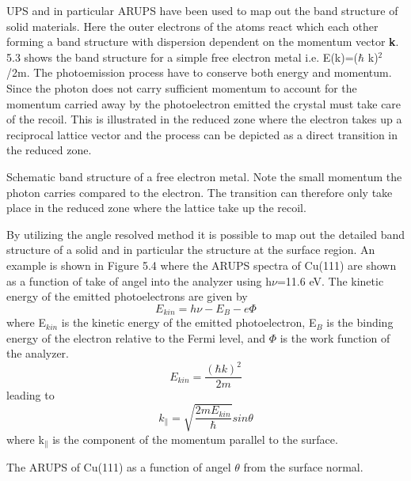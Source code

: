 UPS and in particular ARUPS have been used to map out the band structure of solid materials. Here the outer electrons of the atoms react which each other forming a band structure with dispersion dependent on the momentum vector {\bf k}. 5.3 shows the band structure for a simple free electron metal i.e. E(k)=($\hbar$ k)$^2$/2m. The photoemission process have to conserve both energy and momentum. Since the photon does not carry sufficient momentum to account for the momentum carried away by the photoelectron emitted  the crystal must take care of the recoil. This is illustrated in the reduced zone where the electron takes up a reciprocal lattice vector and the process can be depicted as a direct transition in the reduced zone.


\vspace*{11cm}

           Schematic band structure of a free electron metal. Note the small momentum the photon carries compared to the electron. The transition can therefore only take place in the reduced zone where the lattice take up the recoil.

\vspace{1cm}

By utilizing the angle resolved method it is possible to map out the detailed band structure of a solid and in particular the structure at the surface region. An example is shown in Figure 5.4 where the ARUPS spectra of Cu(111) are shown as a function of take of angel into the analyzer using h$\nu$=11.6 eV.  The kinetic energy of the emitted  photoelectrons are given by
\begin{equation}
E_{kin}=h\nu-E_B-e\Phi
\end{equation}
where E$_{kin}$ is the kinetic energy of the emitted photoelectron, E$_B$ is the binding energy of the electron relative to the Fermi level, and $\Phi$ is the work function of the analyzer.
\begin{equation}
E_{kin}=\frac{(\hbar k)^2}{2m}
\end{equation}
leading to 
\begin{equation}
k_\parallel=\sqrt{\frac{2mE_{kin}}{\hbar}}sin{\theta}
\end{equation}
where k$_\parallel$  is the component of the momentum parallel to the surface.


\vspace*{11cm}

           The ARUPS of Cu(111) as a function of angel $\theta$ from the surface normal.

